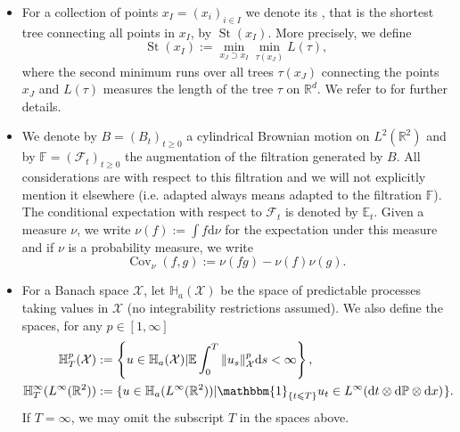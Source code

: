 \documentclass[11pt, a4paper]{scrartcl}
\numberwithin{equation}{section}
\theoremstyle{plain}
\theoremstyle{remark}
\newcommand{\assign}{:=}
\newcommand{\mathd}{\mathrm{d}}
\newcommand{\nosymbol}{}
\newcommand{\tmop}[1]{\ensuremath{\operatorname{#1}}}
\newcommand{\tmtextit}[1]{\text{{\itshape{#1}}}}
\begin{document}
\begin{itemize}
	\item For a collection of points $x_I = (x_i)_{i \in I}$ we denote its
	      \tmtextit{Steiner diameter}, that is the shortest tree connecting all points
	      in $x_I$, by $\tmop{St} (x_I)$. More precisely, we define
	      \begin{equation}
		      \tmop{St} (x_I) \assign \min_{x_J \supset x_I} \min_{\tau (x_J)} L (\tau),
		      \label{eq:def-St}
	      \end{equation}
	      where the second minimum runs over all trees $\tau (x_J)$ connecting the
	      points $x_J$ and $L (\tau)$ measures the length of the tree $\tau$ on
	      $\mathbb{R}^d$. We refer to {\cite{giulianiGentleIntroductionRigorous2021}}
	      for further details.

	\item We denote by $B = (B_t)_{t \geqslant 0}$ a cylindrical Brownian motion
	      on $L^2 (\mathbb{R}^2)$ and by $\mathbb{F}= (\mathcal{F}_t)_{t \geqslant 0}$
	      the augmentation of the filtration generated by $B$. All considerations are
	      with respect to this filtration and we will not explicitly mention it
	      elsewhere (i.e. adapted always means adapted to the filtration
	      $\mathbb{F}$). The conditional expectation with respect to $\mathcal{F}_t$
	      is denoted by $\mathbb{E}_t$. Given a measure $\nu$, we
	      write $\nu (f) \assign \int f \mathd \nu$ for the expectation under this
	      measure and if $\nu$ is a probability measure, we write
	      \[ \tmop{Cov}_{\nu} (f, g) \assign \nu (fg) - \nu (f) \nu (g) . \]
	\item For a Banach space $\mathcal{X}$, let $\mathbb{H}_a (\mathcal{X})$ be
	      the space of predictable processes taking values in $\mathcal{X}$ (no
	      integrability restrictions assumed). We also define the spaces, for any $p
		      \in [1, \infty]$
	      \begin{align*}
		      \mathbb{H}^p_T (\mathcal{X})                      & \assign \left\{ u \in \mathbb{H}_a
		      (\mathcal{X}) | \mathbb{E} \int_0^T \| u_s \|_{\mathcal{X}}^p \mathd s
		      < \infty \right\},                                                                     \\
		      \mathbb{H}^{\infty}_T (L^{\infty} (\mathbb{R}^2)) & \assign \{ u \in
		      \mathbb{H}_a (L^{\infty} (\mathbb{R}^2)) | \mathbbm{1}_{\{ t \leqslant
			      T \}} u_t \in L^{\infty} (\mathd t \otimes \mathd \mathbb{P} \otimes \mathd
		      x)_{\nosymbol} \}.
	      \end{align*}
	      If $T = \infty$, we may omit the subscript $T$ in the spaces above.


\end{itemize}
\end{document}
